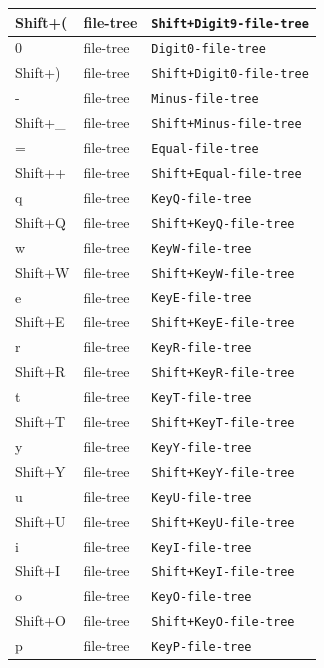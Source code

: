 \documentclass[11pt, a4paper]{article}
\begin{document}
\begin{appendices}
\begin{longtable}{|p{}|p{}|p{}|}
    Shift+( & file-tree & \texttt{Shift+Digit9-file-tree} \\ \hline
    0 & file-tree & \texttt{Digit0-file-tree} \\ \hline
    Shift+) & file-tree & \texttt{Shift+Digit0-file-tree} \\ \hline
    - & file-tree & \texttt{Minus-file-tree} \\ \hline
    Shift+\_ & file-tree & \texttt{Shift+Minus-file-tree} \\ \hline
    = & file-tree & \texttt{Equal-file-tree} \\ \hline
    Shift++ & file-tree & \texttt{Shift+Equal-file-tree} \\ \hline
    q & file-tree & \texttt{KeyQ-file-tree} \\ \hline
    Shift+Q & file-tree & \texttt{Shift+KeyQ-file-tree} \\ \hline
    w & file-tree & \texttt{KeyW-file-tree} \\ \hline
    Shift+W & file-tree & \texttt{Shift+KeyW-file-tree} \\ \hline
    e & file-tree & \texttt{KeyE-file-tree} \\ \hline
    Shift+E & file-tree & \texttt{Shift+KeyE-file-tree} \\ \hline
    r & file-tree & \texttt{KeyR-file-tree} \\ \hline
    Shift+R & file-tree & \texttt{Shift+KeyR-file-tree} \\ \hline
    t & file-tree & \texttt{KeyT-file-tree} \\ \hline
    Shift+T & file-tree & \texttt{Shift+KeyT-file-tree} \\ \hline
    y & file-tree & \texttt{KeyY-file-tree} \\ \hline
    Shift+Y & file-tree & \texttt{Shift+KeyY-file-tree} \\ \hline
    u & file-tree & \texttt{KeyU-file-tree} \\ \hline
    Shift+U & file-tree & \texttt{Shift+KeyU-file-tree} \\ \hline
    i & file-tree & \texttt{KeyI-file-tree} \\ \hline
    Shift+I & file-tree & \texttt{Shift+KeyI-file-tree} \\ \hline
    o & file-tree & \texttt{KeyO-file-tree} \\ \hline
    Shift+O & file-tree & \texttt{Shift+KeyO-file-tree} \\ \hline
    p & file-tree & \texttt{KeyP-file-tree} \\ \hline

\end{longtable}
\end{appendices}
\end{document}
